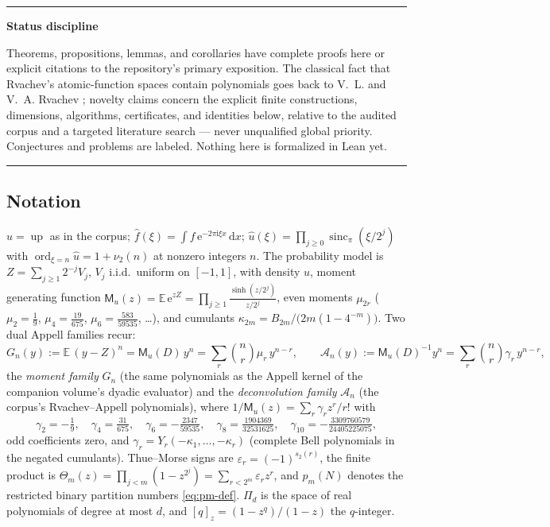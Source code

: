\documentclass[11pt,oneside]{article}
\numberwithin{equation}{section}
\theoremstyle{definition}
\theoremstyle{remark}
\newcommand{\E}{\mathbb E}
\newcommand{\dd}{\,\mathrm d}
\newcommand{\e}{\mathrm e}
\newcommand{\ii}{\mathrm i}
\newcommand{\Up}{\operatorname{up}}
\newcommand{\sincpi}{\operatorname{sinc}_{\pi}}
\newcommand{\eps}{\varepsilon}
\newcommand{\vtwo}{\nu_2}
\newcommand{\wt}{s_2}
\DeclareMathOperator{\ord}{ord}
\newcommand{\Bell}{Y}
\newcommand{\ThetaTM}{\Theta}
\newcommand{\MM}{\mathsf M}
\newcommand{\Gd}{\mathcal A}
\newcommand{\PiD}{\Pi_d}
\newenvironment{statusbox}[1]{%
  \par\smallskip\noindent\begin{center}\begin{minipage}{0.94\textwidth}%
  \hrule\vspace{0.5em}\noindent\textbf{#1}\par\smallskip
}{%
  \vspace{0.5em}\hrule\end{minipage}\end{center}\smallskip
}
\begin{document}
\begin{statusbox}{Status discipline}
Theorems, propositions, lemmas, and corollaries have complete proofs
here or explicit citations to the repository's primary exposition.
The classical fact that Rvachev's atomic-function spaces contain
polynomials goes back to V.~L. and V.~A. Rvachev
\cite{RvachevRvachev1972,Rvachev1990}; novelty claims concern the
explicit finite constructions, dimensions, algorithms, certificates,
and identities below, relative to the audited corpus and a targeted
literature search --- never unqualified global priority.  Conjectures
and problems are labeled.  Nothing here is formalized in Lean yet.
\end{statusbox}

\subsection*{Notation}

$u=\Up$ as in the corpus; $\widehat f(\xi)=\int f\,\e^{-2\pi\ii\xi x}\dd x$;
$\widehat u(\xi)=\prod_{j\ge0}\sincpi(\xi/2^{j})$ with
$\ord_{\xi=n}\widehat u=1+\vtwo(n)$ at nonzero integers $n$.  The
probability model is $Z=\sum_{j\ge1}2^{-j}V_j$, $V_j$ i.i.d.\ uniform
on $[-1,1]$, with density $u$, moment generating function
$\MM_u(z)=\E\,\e^{zZ}=\prod_{j\ge1}\frac{\sinh(z/2^{j})}{z/2^{j}}$,
even moments $\mu_{2r}$ ($\mu_2=\tfrac19$, $\mu_4=\tfrac{19}{675}$,
$\mu_6=\tfrac{583}{59535}$, \dots), and cumulants
$\kappa_{2m}=B_{2m}/\bigl(2m(1-4^{-m})\bigr)$.  Two dual Appell
families recur:
\begin{equation}
 G_n(y):=\E\,(y-Z)^{n}=\MM_u(D)\,y^{n}
 =\sum_{r}\binom nr\mu_r\,y^{n-r},
 \qquad
 \Gd_n(y):=\MM_u(D)^{-1}y^{n}
 =\sum_{r}\binom nr\gamma_r\,y^{n-r},
 \label{eq:appell-pair}
\end{equation}
the \emph{moment family} $G_n$ (the same polynomials as the Appell
kernel of the companion volume's dyadic evaluator) and the
\emph{deconvolution family} $\Gd_n$ (the corpus's Rvachev--Appell
polynomials), where
$1/\MM_u(z)=\sum_r\gamma_rz^{r}/r!$ with
\begin{equation}
 \gamma_2=-\tfrac19,\quad
 \gamma_4=\tfrac{31}{675},\quad
 \gamma_6=-\tfrac{2347}{59535},\quad
 \gamma_8=\tfrac{1904369}{32531625},\quad
 \gamma_{10}=-\tfrac{3309760579}{24405225075},
 \label{eq:gamma-values}
\end{equation}
odd coefficients zero, and
$\gamma_r=\Bell_r(-\kappa_1,\dots,-\kappa_r)$ (complete Bell
polynomials in the negated cumulants).  Thue--Morse signs are
$\eps_r=(-1)^{\wt(r)}$, the finite product is
$\ThetaTM_m(z)=\prod_{j<m}(1-z^{2^{j}})=\sum_{r<2^{m}}\eps_rz^{r}$,
and $p_m(N)$ denotes the restricted binary partition numbers
\eqref{eq:pm-def}.  $\PiD$ is the space of real polynomials of degree
at most $d$, and $[q]_z=(1-z^{q})/(1-z)$ the $q$-integer.
\end{document}
